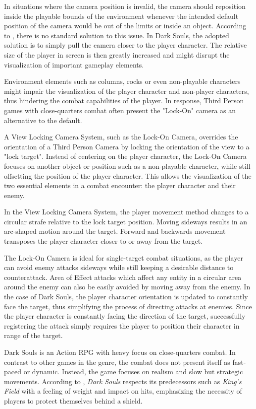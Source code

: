 In situations where the camera position is invalid, the camera should reposition inside the playable bounds of the environment whenever the intended default position of the camera would be out of the limits or inside an object. According to \cite{BOOK_RealTimeCameras}, there is no standard solution to this issue. In Dark Souls, the adopted solution is to simply pull the camera closer to the player character. The relative size of the player in screen is then greatly increased and might disrupt the visualization of important gameplay elements. 

Environment elements such as columns, rocks or even non-playable characters might impair the visualization of the player character and non-player characters, thus hindering the combat capabilities of the player. In response, Third Person games with close-quarters combat often present the "Lock-On" camera as an alternative to the default.

A View Locking Camera System, such as the Lock-On Camera, overrides the orientation of a Third Person Camera by locking the orientation of the view to a "lock target". Instead of centering on the player character, the Lock-On Camera focuses on another object or position such as a non-playable character, while still offsetting the position of the player character. This allows the visualization of the two essential elements in a combat encounter: the player character and their enemy.

In the View Locking Camera System, the player movement method changes to a circular strafe relative to the lock target position. Moving sideways results in an arc-shaped motion around the target. Forward and backwards movement transposes the player character closer to or away from the target.

The Lock-On Camera is ideal for single-target combat situations, as the player can avoid enemy attacks sideways while still keeping a desirable distance to counterattack. Area of Effect attacks which affect any entity in a circular area around the enemy can also be easily avoided by moving away from the enemy. In the case of Dark Souls, the player character orientation is updated to constantly face the target, thus simplifying the process of directing attacks at enemies. Since the player character is constantly facing the direction of the target, successfully registering the attack simply requires the player to position their character in range of the target.

Dark Souls is an Action RPG with heavy focus on close-quarters combat. In contrast to other games in the genre, the combat does not present itself as fast-paced or dynamic. Instead, the game focuses on realism and slow but strategic movements. According to \cite{BOOK_DarkSoulsBeyondTheGrave}, \emph{Dark Souls} respects its predecessors such as \emph{King's Field} with a feeling of weight and impact on hits, emphasizing the necessity of players to protect themselves behind a shield.

